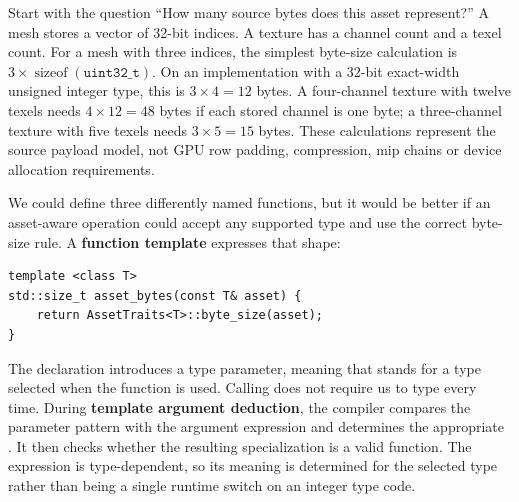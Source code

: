 \hypertarget{05-engine-i-ch005-the-repeated-operation-is-a-function-whose-input-type-can-vary}{}

Start with the question ``How many source bytes does this asset represent?'' A mesh stores a vector of 32-bit indices. A texture has a channel count and a texel count. For a mesh with three indices, the simplest byte-size calculation is \(3\times\operatorname{sizeof}(\texttt{uint32\_t})\). On an implementation with a 32-bit exact-width unsigned integer type, this is \(3\times4=12\) bytes. A four-channel texture with twelve texels needs \(4\times12=48\) bytes if each stored channel is one byte; a three-channel texture with five texels needs \(3\times5=15\) bytes. These calculations represent the source payload model, not GPU row padding, compression, mip chains or device allocation requirements.

We could define three differently named functions, but it would be better if an asset-aware operation could accept any supported type and use the correct byte-size rule. A \textbf{function template} expresses that shape:

\begin{verbatim}
template <class T>
std::size_t asset_bytes(const T& asset) {
    return AssetTraits<T>::byte_size(asset);
}
\end{verbatim}

The  declaration introduces a type parameter, meaning that  stands for a type selected when the function is used. Calling  does not require us to type  every time. During \textbf{template argument deduction}, the compiler compares the parameter pattern  with the argument expression and determines the appropriate . It then checks whether the resulting specialization is a valid function. The expression  is type-dependent, so its meaning is determined for the selected type rather than being a single runtime switch on an integer type code.

